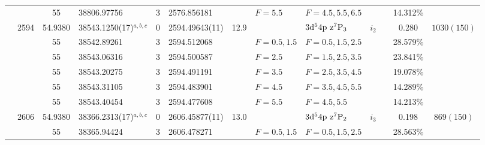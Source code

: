 \begin{table*}
\begin{center}
{\begin{tabular}{:l;l;c;l;c;l;c;l;l;c;c;c;c}
\rowstyle{\itshape}               &        & 55        & 38806.97756$^{}$                 & 3 &   2576.856181      &      & $F=5.5                                   $ & $F=4.5,5.5,6.5                           $ & $      $ &              & 14.312\%  & $          $\\
                                  & 2594   & 54.9380   & 38543.1250(17)$^{a,b,c}$         & 0 &    2594.49643(11)  & 12.9 & $                                        $ & $3\rm{d}^54\rm{p~z}^7\rm{P}_3            $ & $i_{2} $ &              & 0.280     & $ 1030(150)$\\
\rowstyle{\itshape}               &        & 55        & 38542.89261$^{}$                 & 3 &   2594.512068      &      & $F=0.5,1.5                               $ & $F=0.5,1.5,2.5                           $ & $      $ &              & 28.579\%  & $          $\\
\rowstyle{\itshape}               &        & 55        & 38543.06316$^{}$                 & 3 &   2594.500587      &      & $F=2.5                                   $ & $F=1.5,2.5,3.5                           $ & $      $ &              & 23.841\%  & $          $\\
\rowstyle{\itshape}               &        & 55        & 38543.20275$^{}$                 & 3 &   2594.491191      &      & $F=3.5                                   $ & $F=2.5,3.5,4.5                           $ & $      $ &              & 19.078\%  & $          $\\
\rowstyle{\itshape}               &        & 55        & 38543.31105$^{}$                 & 3 &   2594.483901      &      & $F=4.5                                   $ & $F=3.5,4.5,5.5                           $ & $      $ &              & 14.289\%  & $          $\\
\rowstyle{\itshape}               &        & 55        & 38543.40454$^{}$                 & 3 &   2594.477608      &      & $F=5.5                                   $ & $F=4.5,5.5                               $ & $      $ &              & 14.213\%  & $          $\\
                                  & 2606   & 54.9380   & 38366.2313(17)$^{a,b,c}$         & 0 &    2606.45877(11)  & 13.0 & $                                        $ & $3\rm{d}^54\rm{p~z}^7\rm{P}_2            $ & $i_{3} $ &              & 0.198     & $  869(150)$\\
\rowstyle{\itshape}               &        & 55        & 38365.94424$^{}$                 & 3 &   2606.478271      &      & $F=0.5,1.5                               $ & $F=0.5,1.5,2.5                           $ & $      $ &              & 28.563\%  & $          $\\

\end{tabular}}
\end{center}
\end{table*}
